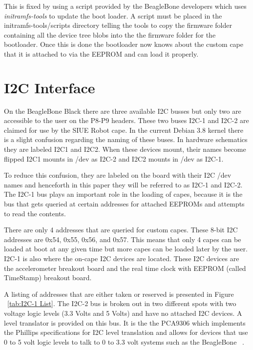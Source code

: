 \documentclass[12pt,oneside,final]{siuethesis}
\theoremstyle{definition}
\begin{document}
This is fixed by using a script provided by the BeagleBone developers which uses \emph{initramfs-tools} to update the boot loader. A script must be placed in the initramfs-tools/scripts directory telling the tools to copy the firmware folder containing all the device tree blobs into the the firmware folder for the bootloader. Once this is done the bootloader now knows about the custom cape that it is attached to via the EEPROM and can load it properly.


\section{I2C Interface}

On the BeagleBone Black there are three available I2C busses but only two are accessible to the user on the P8-P9 headers.  These two buses I2C-1 and I2C-2 are claimed for use by the SIUE Robot cape. In the current Debian 3.8 kernel there is a slight confusion regarding the naming of these buses. In hardware schematics they are labeled I2C1 and I2C2. When these devices mount, their names become flipped I2C1 mounts in /dev as I2C-2 and I2C2 mounts in /dev as I2C-1.  

To reduce this confusion, they are labeled on the board with their I2C /dev names and henceforth in this paper they will be referred to as I2C-1 and I2C-2. The I2C-1 bus plays an important role in the loading of capes, because it is the bus that gets queried at certain addresses for attached EEPROMs and attempts to read the contents. 

There are only 4 addresses that are queried for custom capes. These 8-bit I2C addresses are 0x54, 0x55, 0x56, and 0x57. This means that only 4 capes can be loaded at boot at any given time but more capes can be loaded later by the user. I2C-1 is also where the on-cape I2C devices are located.  These I2C devices are the accelerometer breakout board and the real time clock with EEPROM (called TimeStamp) breakout board. 

A listing of addresses that are either taken or reserved is presented in Figure ~\ref{tab:I2C-1 List}. The I2C-2 bus is broken out in two different spots with two voltage logic levels (3.3 Volts and 5 Volts) and have no attached I2C devices. A level translator is provided on this bus.  It is the the PCA9306 which implements the Phillips specifications for I2C level translation and allows for devices that use 0 to 5 volt logic levels to talk to 0 to 3.3 volt systems such as the BeagleBone ~\cite{PCA9306}. 
\end{document}
